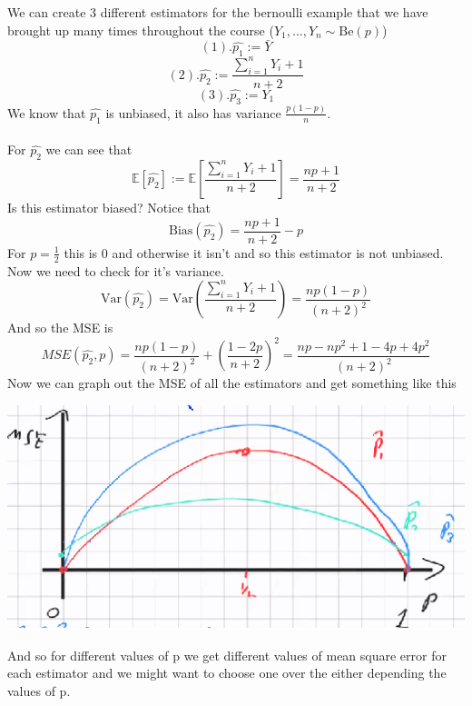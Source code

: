 \documentclass[../main.tex]{subfiles}
\begin{document}
\begin{example} We can create 3 different estimators for the bernoulli example that we have brought up many times throughout the course ($Y_1,\dots,Y_n\sim\text{Be}(p)$)
\[(1). \hat{p_1}:= \bar{Y}\]
\[(2). \hat{p_2}:=\frac{\sum_{i=1}^n Y_i +1}{n+2}\]
\[(3). \hat{p_3}:=Y_1\]
We know that $\hat{p_1}$ is unbiased, it also has variance $\frac{p(1-p)}{n}$. \\\\
For $\hat{p_2}$ we can see that \[\mathbb{E}[\hat{p_2}]:=\mathbb{E}\left[\frac{\sum_{i=1}^n Y_i +1}{n+2}\right]=\frac{np+1}{n+2}\]
Is this estimator biased?
Notice that
\[\text{Bias}(\hat{p_2})=\frac{np+1}{n+2}-p\]
For $p=\frac{1}{2}$ this is 0 and otherwise it isn't and so this estimator is not unbiased. Now we need to check for it's variance. 
\[\text{Var}(\hat{p_2}) = \text{Var}\left(\frac{\sum_{i=1}^n Y_i +1}{n+2}\right) = \frac{np(1-p)}{(n+2)^2}\]
And so the MSE is 
\[MSE(\hat{p_2},p) = \frac{np(1-p)}{(n+2)^2} + (\frac{1-2p}{n+2})^2=\frac{np-np^2+1-4p+4p^2}{(n+2)^2}\]
Now we can graph out the MSE of all the estimators and get something like this 
\begin{center}
    \includegraphics{images/MSE_Photo_2.png}
\end{center}
And so for different values of p we get different values of mean square error for each estimator and we might want to choose one over the either depending the values of p. 
\end{example}
\end{document}
